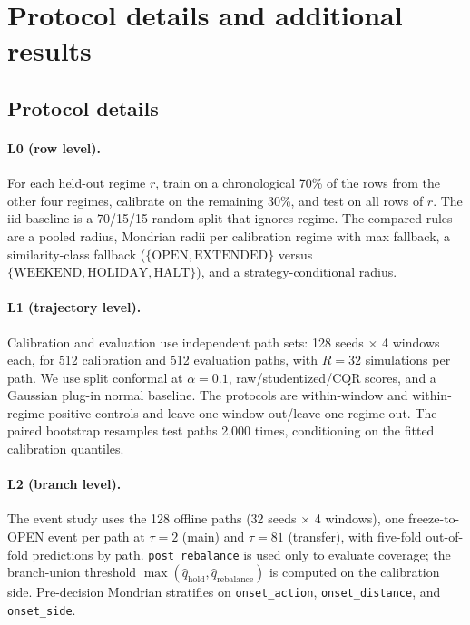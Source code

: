 %
%

\section{Protocol details and additional results}\label{app:b}

\subsection{Protocol details}\label{app:b1}

\paragraph{L0 (row level).}
For each held-out regime $r$, train on a chronological 70\% of the rows from the
other four regimes, calibrate on the remaining 30\%, and test on all rows of $r$.
The iid baseline is a 70/15/15 random split that ignores regime. The compared
rules are a pooled radius, Mondrian radii per calibration regime with max
fallback, a similarity-class fallback ($\{\text{OPEN},\text{EXTENDED}\}$ versus
$\{\text{WEEKEND},\text{HOLIDAY},\text{HALT}\}$), and a strategy-conditional
radius.

\paragraph{L1 (trajectory level).}
Calibration and evaluation use independent path sets: 128 seeds $\times$ 4
windows each, for 512 calibration and 512 evaluation paths, with $R=32$
simulations per path. We use split conformal at $\alpha=0.1$,
raw/studentized/CQR scores, and a Gaussian plug-in normal baseline. The
protocols are within-window and within-regime positive controls and
leave-one-window-out/leave-one-regime-out. The paired bootstrap resamples test
paths 2{,}000 times, conditioning on the fitted calibration quantiles.

\paragraph{L2 (branch level).}
The event study uses the 128 offline paths (32 seeds $\times$ 4 windows), one
freeze-to-OPEN event per path at $\tau=2$ (main) and $\tau=81$ (transfer), with
five-fold out-of-fold predictions by path. \texttt{post\_rebalance} is used only
to evaluate coverage; the branch-union threshold
$\max(\hat q_{\mathrm{hold}},\hat q_{\mathrm{rebalance}})$ is computed on the
calibration side. Pre-decision Mondrian stratifies on \texttt{onset\_action},
\texttt{onset\_distance}, and \texttt{onset\_side}.

